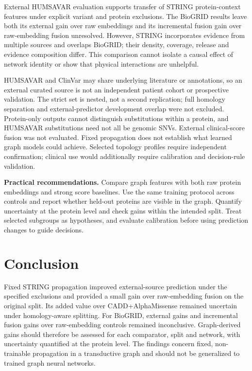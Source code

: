 \documentclass[conference]{IEEEtran}
\begin{document}
External HUMSAVAR evaluation supports transfer of STRING protein-context features under explicit variant and protein exclusions. The BioGRID results leave both its external gain over raw embeddings and its incremental fusion gain over raw-embedding fusion unresolved. However, STRING incorporates evidence from multiple sources and overlaps BioGRID; their density, coverage, release and evidence composition differ. This comparison cannot isolate a causal effect of network identity or show that physical interactions are unhelpful.

HUMSAVAR and ClinVar may share underlying literature or annotations, so an external curated source is not an independent patient cohort or prospective validation. The strict set is nested, not a second replication; full homology separation and external-predictor development overlap were not excluded. Protein-only outputs cannot distinguish substitutions within a protein, and HUMSAVAR substitutions need not all be genomic SNVs. External clinical-score fusion was not evaluated. Fixed propagation does not establish what learned graph models could achieve. Selected topology profiles require independent confirmation; clinical use would additionally require calibration and decision-rule validation.

\noindent\textbf{Practical recommendations.}
Compare graph features with both raw protein embeddings and strong score baselines. Use the same training protocol across controls and report whether held-out proteins are visible in the graph. Quantify uncertainty at the protein level and check gains within the intended split. Treat selected subgroups as hypotheses, and evaluate calibration before using prediction changes to guide decisions.

\section{Conclusion}
Fixed STRING propagation improved external-source prediction under the specified exclusions and provided a small gain over raw-embedding fusion on the original split. Its added value over CADD+AlphaMissense remained uncertain under homology-aware splitting. For BioGRID, external gains and incremental fusion gains over raw-embedding controls remained inconclusive. Graph-derived gains should therefore be assessed for each comparator, split and network, with uncertainty quantified at the protein level. The findings concern fixed, non-trainable propagation in a transductive graph and should not be generalized to trained graph neural networks.
\end{document}
